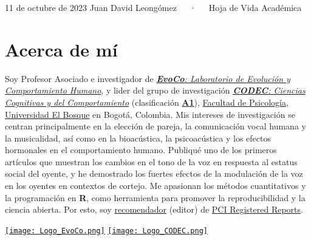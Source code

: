 \documentclass[11pt,a4paper,]{awesome-cv}
\begin{document}
\makecvheader

\makecvfooter
  {11 de octubre de 2023}
    {Juan David Leongómez~~~·~~~Hoja de Vida Académica}
  {\thepage}





\hypertarget{acerca-de-muxed}{%
\section{Acerca de mí}\label{acerca-de-muxed}}

\begin{minipage}[c]{0.85\linewidth}
Soy Profesor Asociado e investigador de \href{https://jdleongomez.info/es/team/}{\textit{\textbf{EvoCo}: Laboratorio de Evolución y Comportamiento Humano}}, y lider del grupo de investigación \href{https://investigaciones.unbosque.edu.co/codec}{\textit{\textbf{CODEC}: Ciencias Cognitivas y del Comportamiento}} (clasificación  \href{https://scienti.minciencias.gov.co/gruplac/jsp/visualiza/visualizagr.jsp?nro=00000000001446}{\textbf{A1}}),  \href{https://www.uelbosque.edu.co/psicologia}{Facultad de Psicología}, \href{https://www.uelbosque.edu.co/}{Universidad El Bosque} en Bogotá, Colombia. Mis intereses de investigación se centran principalmente en la elección de pareja, la comunicación vocal humana y la musicalidad, así como en la bioacústica, la psicoacústica y los efectos hormonales en el comportamiento humano. Publiqué uno de los primeros artículos que muestran los cambios en el tono de la voz en respuesta al estatus social del oyente, y he demostrado los fuertes efectos de la modulación de la voz en los oyentes en contextos de cortejo. Me apasionan los métodos cuantitativos y la programación en \textbf{R}, como herramienta para promover la reproducibilidad y la ciencia abierta. Por esto, soy \href{https://rr.peercommunityin.org/about/recommenders}{recomendador} (editor) de \href{https://rr.peercommunityin.org/}{PCI Registered Reports}.
\end{minipage} \begin{minipage}[c]{0.15\linewidth}
\begin{flushright} 
\hfill \href{https://jdleongomez.info/es/team/}{\texttt{[image: Logo\_EvoCo.png]}} \newline \href{https://investigaciones.unbosque.edu.co/codec}{\texttt{[image: Logo\_CODEC.png]}}
\end{flushright}
\end{minipage}
\end{document}
